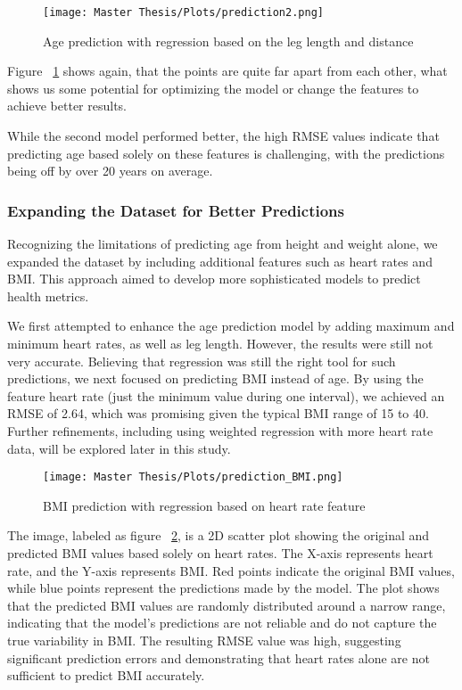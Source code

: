 \FloatBarrier
\begin{figure}[h!]
\centering
\texttt{[image: Master Thesis/Plots/prediction2.png]}
\caption{Age prediction with regression based on the leg length and distance}
\label{figure:regwithleglengthdistance}
\end{figure}
\FloatBarrier

Figure ~\ref{figure:regwithleglengthdistance} shows again, that the points are quite far apart from each other, what shows us some potential for optimizing the model or change the features to achieve better results.

While the second model performed better, the high RMSE values indicate that predicting age based solely on these features is challenging, with the predictions being off by over 20 years on average.

\subsubsection*{Expanding the Dataset for Better Predictions}
Recognizing the limitations of predicting age from height and weight alone, we expanded the dataset by including additional features such as heart rates and BMI. This approach aimed to develop more sophisticated models to predict health metrics.

We first attempted to enhance the age prediction model by adding maximum and minimum heart rates, as well as leg length. However, the results were still not very accurate. Believing that regression was still the right tool for such predictions, we next focused on predicting BMI instead of age. By using the feature heart rate (just the minimum value during one interval), we achieved an RMSE of 2.64, which was promising given the typical BMI range of 15 to 40. Further refinements, including using weighted regression with more heart rate data, will be explored later in this study.

\FloatBarrier
\begin{figure}[h!]
\centering
\texttt{[image: Master Thesis/Plots/prediction\_BMI.png]}
\caption{BMI prediction with regression based on heart rate feature}
\label{figure:regwithheartrate}
\end{figure}
\FloatBarrier

The image, labeled as figure ~\ref{figure:regwithheartrate}, is a 2D scatter plot showing the original and predicted BMI values based solely on heart rates. The X-axis represents heart rate, and the Y-axis represents BMI. Red points indicate the original BMI values, while blue points represent the predictions made by the model. The plot shows that the predicted BMI values are randomly distributed around a narrow range, indicating that the model's predictions are not reliable and do not capture the true variability in BMI. The resulting RMSE value was high, suggesting significant prediction errors and demonstrating that heart rates alone are not sufficient to predict BMI accurately.

